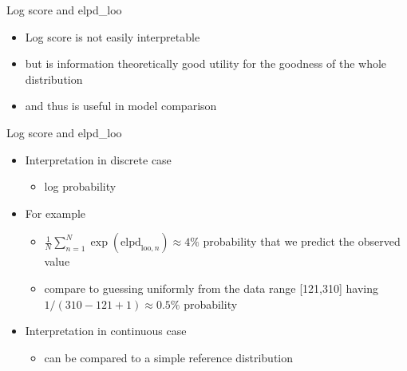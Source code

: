 \documentclass[english,t]{beamer}
\begin{document}
\begin{frame}{Log score and elpd\_loo}

  \begin{itemize}
  \item Log score is not easily interpretable
  \item but is information theoretically good utility for the goodness
    of the whole distribution
  \item and thus is useful in model comparison
  \end{itemize}

\end{frame}

\begin{frame}{Log score and elpd\_loo}

  \begin{itemize}
  \item Interpretation in discrete case
    \begin{itemize}
    \item log probability
    \end{itemize}
  \item<2-> For example
    \begin{itemize}
    \item $\frac{1}{N}\sum_{n=1}^N\exp(\mathrm{elpd}_{\mathrm{loo},n}) \approx 4\%$ probability that we predict the
      observed value
    \item<3-> compare to guessing uniformly from the data range [121,310] having
      $1/(310-121+1) \approx 0.5\%$ probability 
    \end{itemize}
  \item<5-> Interpretation in continuous case
    \begin{itemize}
    \item can be compared to a simple reference distribution
    \end{itemize}
  \end{itemize}

\end{frame}
\end{document}
